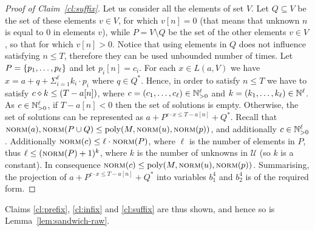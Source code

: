 \begin{appendixproof}
\begin{proof}[Proof of Claim~\ref{cl:suffix}]
Let us consider all the elements of set $V$. Let $Q \subseteq V$ be the set of these elements $v \in V$,
for which $v[n] = 0$ (that means that unknown $n$ is equal to $0$ in elements $v$),
while $P = V \setminus Q$ be the set of the other elements $v \in V$,
so that for which $v[n] > 0$.
Notice that using elements in $Q$ does not influence satisfying $n \leq T$, therefore they
can be used unbounded number of times.
Let $P = \{p_1, \ldots, p_\ell\}$ and let $p_i[n] = c_i$. For each $x \in L(a, V)$ we have $x = a + q + \Sigma_{i=1}^{\ell}k_i \cdot p_i$ where $q \in Q^*$. Hence, in order to satisfy $n \leq T$ we have to satisfy $c \diamond k \leq (T - a[n])$, where $c = (c_1, \ldots, c_\ell) \in \mathbb{N}_{>0}^\ell$ and $k = (k_1, \ldots, k_\ell) \in \mathbb{N}^\ell$.
As $c \in \mathbb{N}_{>0}^\ell$, if $T - a[n] < 0$ then the set of solutions is empty. Otherwise, the set of solutions can be represented as $a+P^{c \cdot x \leq T - a[n]}+Q^*$. Recall that $\textsc{norm}(a), \textsc{norm}(P \cup Q) \leq \textup{poly}(M, \textsc{norm}(u), \textsc{norm}(p))$, and additionally $c \in \mathbb{N}_{>0}^{\ell}$. Additionally $\textsc{norm}(c) \leq \ell \cdot \textsc{norm}(P)$, where
$\ell$ is the number of elements in $P$, thus $\ell \leq (\textsc{norm}(P) + 1)^k$, where $k$ is the number of unknowns in $\mathcal U$
(so $k$ is a constant).
In consequence $\textsc{norm}(c) \leq \textup{poly}(M, \textsc{norm}(u), \textsc{norm}(p))$. Summarising, the projection
of $a+P^{c \cdot x \leq T - a[n]}+Q^*$ into variables $b^4_1$ and $b^4_2$ is of the required form.
\end{proof}
%
Claims \ref{cl:prefix}, \ref{cl:infix} and \ref{cl:suffix} are thus shown, and hence so is Lemma~\ref{lem:sandwich-raw}.
%
\end{appendixproof}
